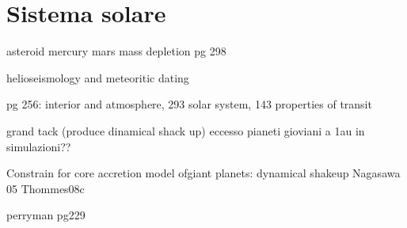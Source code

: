 {\let\clearpage\relax\let\cleardoublepage\relax
\chapter{Sistema solare}
}


\begin{workout}
asteroid mercury mars mass depletion pg 298
\end{workout}

\begin{workout}
helioseismology and meteoritic dating
\end{workout}


\begin{workout}
pg 256: interior and atmosphere, 293 solar system, 143 properties of transit
\end{workout}

\begin{workout}

\end{workout}

\begin{workout}

\end{workout}

\begin{workout}\end{workout}
grand tack (produce dinamical shack up) 
eccesso pianeti gioviani a 1au in simulazioni??
\begin{workout}

\end{workout}


\begin{workout}
Constrain for core accretion model ofgiant planets: dynamical shakeup Nagasawa 05 Thommes08c
\end{workout}

\begin{workout}
perryman pg229
\end{workout}


\begin{workout}

\end{workout}




